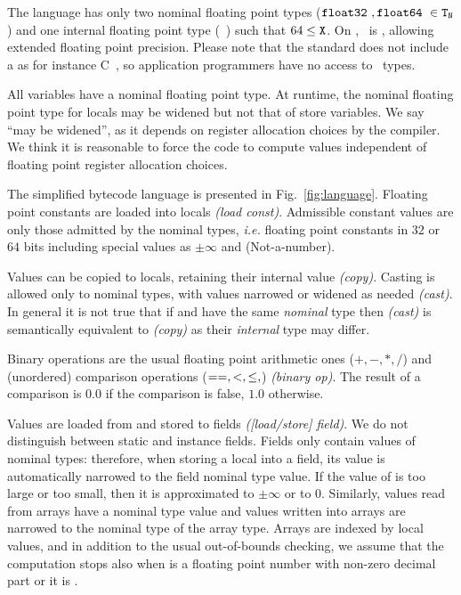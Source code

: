 \documentclass{entcs}
\newcommand{\Float}{\code{float32}\ }
\newcommand{\Double}{\code{float64}\  }
\newcommand{\Internal}{\code{floatX}\ }
\begin{document}
The language has only two nominal floating point types ($\Float, \Double \in \code{T_N}$ ) and one internal floating point type (\Internal) such that $64 \leq \mathtt{X}$.
On , \Internal is , allowing  extended floating point   precision. 
Please note that the  standard does not include a  as for instance C~\cite{C}, so application programmers have no access to  \Internal types.

All variables have a nominal floating point type.
At runtime, the nominal floating point type for locals may be widened
but not that of store variables. We say ``may be widened'', as it
depends on register allocation choices by the compiler. We think it is
reasonable to force the code to compute values independent of floating
point register allocation choices.

The simplified bytecode language is presented in Fig.~\ref{fig:language}.
Floating point constants  are loaded into locals \textit{(load const)}.
Admissible constant values are only those admitted by the nominal types, \emph{i.e.} floating point constants in $32$ or $64$ bits including special values as $\pm \infty$ and  (Not-a-number).

Values can be copied to locals, retaining their internal value \textit{(copy)}.
Casting is allowed only to nominal types, with values  narrowed or widened as needed  \textit{(cast)}.
In general it is not true that if  and  have the same \emph{nominal} type then \textit{(cast)} is semantically equivalent to \textit{(copy)} as their \emph{internal} type may differ.

Binary operations  are the usual floating point arithmetic ones ($+, -, *, /$) and (unordered) comparison operations ($\mathtt{==, <, \leq,}$) \textit{(binary op)}.  
The result of a comparison is $0.0$ if the comparison is false, $1.0$ otherwise.

Values are loaded from and stored to fields \textit{([load/store] field)}.
We do not distinguish between static and instance fields. 
Fields only contain values of nominal types:
therefore, when storing a local into a field, its value is automatically narrowed to the field nominal type value.
If the value of  is too large or too small, then it is approximated to $\pm \infty$ or to $0$.
Similarly, values read from arrays have a nominal type value and values written into arrays are narrowed to the nominal type of the array type.
Arrays are indexed by local values, and in addition to the usual out-of-bounds  checking, we assume that the computation stops also when  is a floating point number with non-zero decimal part or it is .
\end{document}
